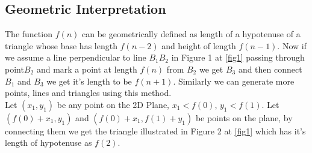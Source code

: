 \documentclass[preprint,12pt]{elsarticle}
\begin{document}
	\subsection{Geometric Interpretation}
	\label{geo}
	The function $f(n)$ can be geometrically defined as length of a hypotenuse of a triangle whose base has length $f(n - 2)$ and height of length $f(n - 1)$. Now if we assume a line perpendicular to line $B_1B_2$ in Figure 1 at \ref{fig1} passing through point$B_2$ and mark a point at length $f(n)$ from $B_2$ we get $B_3$ and then connect $B_1$ and $B_3$ we get it's length to be $f(n + 1)$. Similarly we can generate more points, lines and triangles using this method.\\ Let $(x_1, y_1)$ be any point on the 2D Plane, $x_1 < f(0)$, $y_1 < f(1)$. Let $(f(0) + x_1, y_1)$ and $(f(0) + x_1, f(1) + y_1)$ be points on the plane, by connecting them we get the triangle illustrated in Figure 2 at \ref{fig1} which has it's length of hypotenuse as $f(2)$.\\
\end{document}
